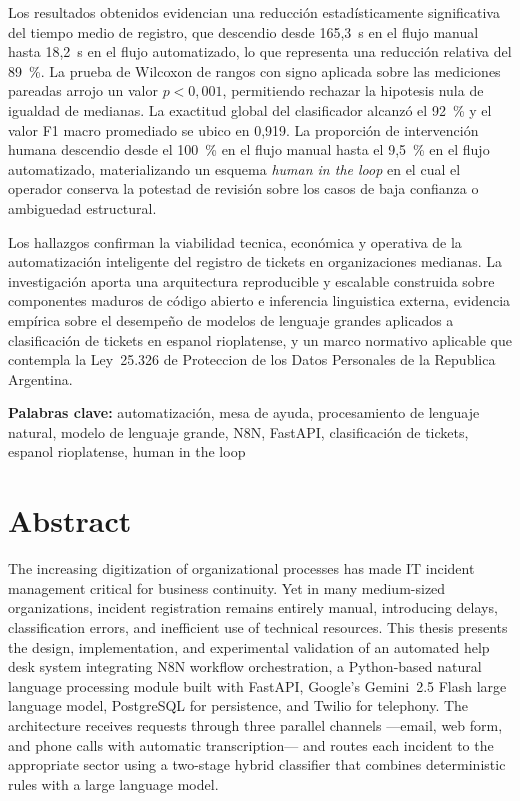 Los resultados obtenidos evidencian una reducción estadísticamente significativa del tiempo medio de registro, que descendio desde 165,3~s en el flujo manual hasta 18,2~s en el flujo automatizado, lo que representa una reducción relativa del 89~\%. La prueba de Wilcoxon de rangos con signo aplicada sobre las mediciones pareadas arrojo un valor \(p < 0{,}001\), permitiendo rechazar la hipotesis nula de igualdad de medianas. La exactitud global del clasificador alcanzó el 92~\% y el valor F1 macro promediado se ubico en 0,919. La proporción de intervención humana descendio desde el 100~\% en el flujo manual hasta el 9,5~\% en el flujo automatizado, materializando un esquema \emph{human in the loop} en el cual el operador conserva la potestad de revisión sobre los casos de baja confianza o ambiguedad estructural.

Los hallazgos confirman la viabilidad tecnica, económica y operativa de la automatización inteligente del registro de tickets en organizaciones medianas. La investigación aporta una arquitectura reproducible y escalable construida sobre componentes maduros de código abierto e inferencia linguistica externa, evidencia empírica sobre el desempeño de modelos de lenguaje grandes aplicados a clasificación de tickets en espanol rioplatense, y un marco normativo aplicable que contempla la Ley~25.326 de Proteccion de los Datos Personales de la Republica Argentina.

\bigskip
\noindent\textbf{Palabras clave:} automatización, mesa de ayuda, procesamiento de lenguaje natural, modelo de lenguaje grande, N8N, FastAPI, clasificación de tickets, espanol rioplatense, human in the loop

\newpage
\section*{Abstract}

The increasing digitization of organizational processes has made IT incident management critical for business continuity. Yet in many medium-sized organizations, incident registration remains entirely manual, introducing delays, classification errors, and inefficient use of technical resources. This thesis presents the design, implementation, and experimental validation of an automated help desk system integrating N8N workflow orchestration, a Python-based natural language processing module built with FastAPI, Google's Gemini~2.5 Flash large language model, PostgreSQL for persistence, and Twilio for telephony. The architecture receives requests through three parallel channels ---email, web form, and phone calls with automatic transcription--- and routes each incident to the appropriate sector using a two-stage hybrid classifier that combines deterministic rules with a large language model.

